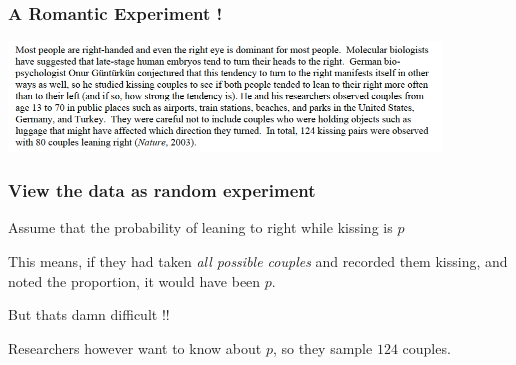 \documentclass{beamer}\usepackage[]{graphicx}\usepackage[]{color}
\begin{document}
\begin{frame}[fragile]

\frametitle{A Romantic Experiment !}


\begin{center}
\includegraphics[width=11.5cm,height=5.3 cm]{KissingRight_StudyDescription.png}
\end{center}

\end{frame}

\begin{frame}[fragile]

\frametitle{View the data as random experiment}

Assume that the probability of leaning to right while kissing is $p$ \pause \newline

This means, if they had taken \textit{all possible couples} and recorded them kissing, 
and noted the proportion, it would have been $p$. \pause \newline

But thats damn difficult !! \pause \newline

Researchers however want to know about $p$, so they sample $124$ couples.

\end{frame}
\end{document}
